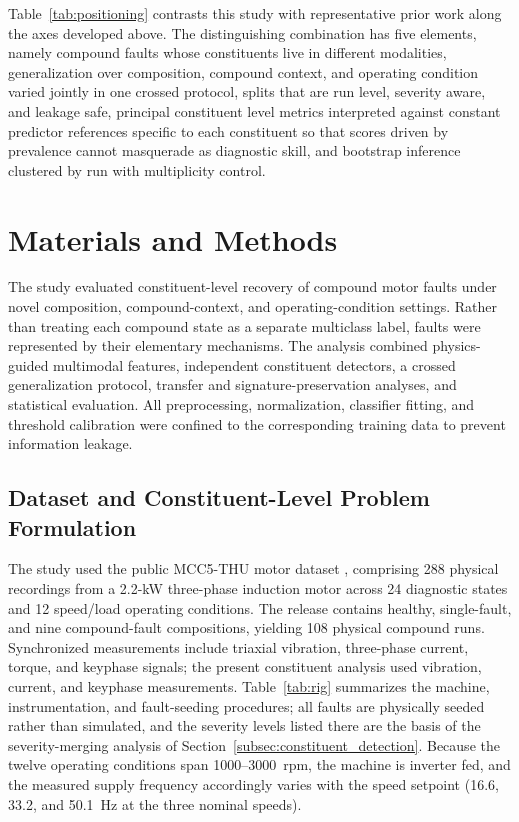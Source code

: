 \documentclass{ieeeaccess}
\begin{document}
Table~\ref{tab:positioning} contrasts this study with representative prior
work along the axes developed above. The distinguishing combination has five
elements, namely compound faults whose constituents live in different
modalities, generalization over composition, compound context, and operating
condition varied jointly in one crossed protocol, splits that are run level,
severity aware, and leakage safe, principal constituent level metrics
interpreted against constant predictor references specific to each
constituent so that scores driven by prevalence cannot masquerade as
diagnostic skill, and bootstrap inference clustered by run with multiplicity
control.

\section{Materials and Methods}
\label{sec:methods}

The study evaluated constituent-level recovery of compound motor faults under novel composition, compound-context, and operating-condition settings.
Rather than treating each compound state as a separate multiclass label, faults were represented by their elementary mechanisms. The analysis combined physics-guided multimodal features, independent constituent detectors, a crossed generalization protocol, transfer and signature-preservation analyses, and statistical evaluation. All preprocessing, normalization, classifier fitting, and threshold calibration were confined to the corresponding training data to prevent information leakage.


\subsection{Dataset and Constituent-Level Problem Formulation}
\label{subsec:problem_formulation}

The study used the public MCC5-THU motor dataset \cite{chen2026}, comprising 288 physical recordings from a 2.2-kW three-phase induction motor across 24 diagnostic states and 12 speed/load operating conditions. The release contains healthy, single-fault, and nine compound-fault compositions, yielding 108 physical compound runs. Synchronized measurements include triaxial vibration, three-phase current, torque, and keyphase signals; the present constituent analysis used vibration, current, and keyphase measurements. Table~\ref{tab:rig} summarizes the machine, instrumentation, and fault-seeding
procedures; all faults are physically seeded rather than simulated, and the
severity levels listed there are the basis of the severity-merging analysis
of Section~\ref{subsec:constituent_detection}. Because the twelve operating
conditions span 1000--3000~rpm, the machine is inverter fed, and the measured
supply frequency accordingly varies with the speed setpoint (16.6, 33.2, and
50.1~Hz at the three nominal speeds).
\end{document}
